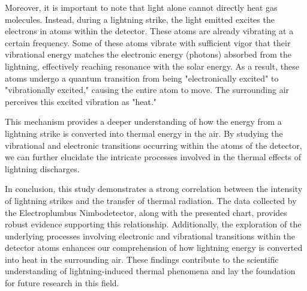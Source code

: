 \documentclass[portuguese]{cenarticle}
\begin{document}
Moreover, it is important to note that light alone cannot directly heat gas molecules. Instead, during a lightning strike, the light emitted excites the electrons in atoms within the detector. These atoms are already vibrating at a certain frequency. Some of these atoms vibrate with sufficient vigor that their vibrational energy matches the electronic energy (photons) absorbed from the lightning, effectively reaching resonance with the solar energy. As a result, these atoms undergo a quantum transition from being "electronically excited" to "vibrationally excited," causing the entire atom to move. The surrounding air perceives this excited vibration as "heat."

This mechanism provides a deeper understanding of how the energy from a lightning strike is converted into thermal energy in the air. By studying the vibrational and electronic transitions occurring within the atoms of the detector, we can further elucidate the intricate processes involved in the thermal effects of lightning discharges.

In conclusion, this study demonstrates a strong correlation between the intensity of lightning strikes and the transfer of thermal radiation. The data collected by the Electroplumbus Nimbodetector, along with the presented chart, provides robust evidence supporting this relationship. Additionally, the exploration of the underlying processes involving electronic and vibrational transitions within the detector atoms enhances our comprehension of how lightning energy is converted into heat in the surrounding air. These findings contribute to the scientific understanding of lightning-induced thermal phenomena and lay the foundation for future research in this field.




  
  {\setlength{\parindent}{0pt}
    
  }
\end{document}
